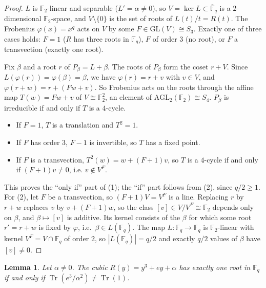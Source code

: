 \documentclass[11pt,a4paper]{amsart}
\newtheorem{lemma}[theorem]{Lemma}
\theoremstyle{definition}
\theoremstyle{remark}
\newcommand{\F}{\mathbb{F}}
\newcommand{\Tr}{\operatorname{Tr}}
\newcommand{\AGL}{\mathrm{AGL}}
\newcommand{\GL}{\mathrm{GL}}
\begin{document}
\begin{proof}
$L$ is $\F_2$-linear and separable ($L'=\alpha\ne0$), so $V=\ker L\subset\overline{\F}_q$ is a $2$-dimensional
$\F_2$-space, and $V\setminus\{0\}$ is the set of roots of $L(t)/t=R(t)$. The Frobenius $\varphi(x)=x^q$ acts on $V$ by
some $F\in\GL(V)\cong S_3$. Exactly one of three cases holds: $F=1$ ($R$ has three roots in $\F_q$), $F$ of order $3$
(no root), or $F$ a transvection (exactly one root).

Fix $\beta$ and a root $r$ of $P_\beta=L+\beta$. The roots of $P_\beta$ form the coset $r+V$. Since
$L(\varphi(r))=\varphi(\beta)=\beta$, we have $\varphi(r)=r+v$ with $v\in V$, and
$\varphi(r+w)=r+(Fw+v)$. So Frobenius acts on the roots through the affine map $T(w)=Fw+v$ of
$V\cong\F_2^2$, an element of $\AGL_2(\F_2)\cong S_4$. $P_\beta$ is irreducible if and only if $T$ is a $4$-cycle.
\begin{itemize}
\item If $F=1$, $T$ is a translation and $T^2=1$.
\item If $F$ has order $3$, $F-1$ is invertible, so $T$ has a fixed point.
\item If $F$ is a transvection, $T^2(w)=w+(F+1)v$, so $T$ is a $4$-cycle if and only if $(F+1)v\ne0$, i.e.
$v\notin V^F$.
\end{itemize}
This proves the ``only if'' part of (1); the ``if'' part follows from (2), since $q/2\ge1$. For (2), let $F$ be a
transvection, so $(F+1)V=V^F$ is a line. Replacing $r$ by $r+w$ replaces $v$ by
$v+(F+1)w$, so the class $[v]\in V/V^F\cong\F_2$ depends only on $\beta$, and $\beta\mapsto[v]$ is additive. Its
kernel consists of the $\beta$ for which some root $r'=r+w$ is fixed by $\varphi$, i.e.\ $\beta\in L(\F_q)$. The map
$L:\F_q\to\F_q$ is $\F_2$-linear with kernel $V^F=V\cap\F_q$ of order $2$, so $|L(\F_q)|=q/2$ and exactly $q/2$ values
of $\beta$ have $[v]\ne0$.
\end{proof}

\begin{lemma}\label{lem:oneroot}
Let $\alpha\ne0$. The cubic $R(y)=y^3+ey+\alpha$ has exactly one root in $\F_q$ if and only if
$\Tr(e^3/\alpha^2)\ne\Tr(1)$.
\end{lemma}
\end{document}
